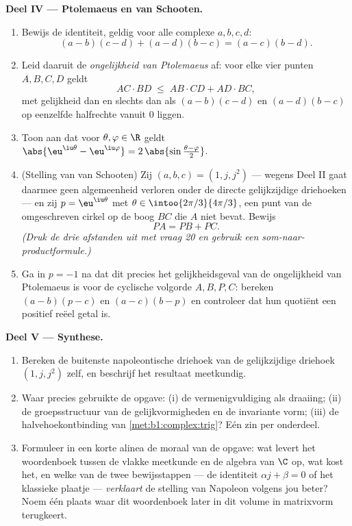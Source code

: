 \begin{problem}
\medskip
\noindent\textbf{Deel IV --- Ptolemaeus en van Schooten.}
\begin{enumerate}[resume]
  \item Bewijs de identiteit, geldig voor alle complexe $a, b, c, d$:
        \[
        (a - b)(c - d) + (a - d)(b - c) = (a - c)(b - d) .
        \]
  \item Leid daaruit de \emph{ongelijkheid van
        Ptolemaeus} af: voor elke
        vier punten $A, B, C, D$ geldt
        \[
        AC \cdot BD \;\leq\; AB \cdot CD + AD \cdot BC ,
        \]
        met gelijkheid dan en slechts dan als $(a-b)(c-d)$ en
        $(a-d)(b-c)$ op eenzelfde halfrechte vanuit $0$ liggen.
  \item Toon aan dat voor $\theta, \varphi \in \R$ geldt
        $\abs{\eu^{\iu\theta} - \eu^{\iu\varphi}} =
        2\,\abs{\sin\frac{\theta - \varphi}2}$.
  \item (Stelling van van Schooten)
        Zij $(a, b, c) = (1, j, j^2)$ --- wegens Deel II gaat daarmee
        geen algemeenheid verloren onder de directe gelijkzijdige
        driehoeken --- en zij $p = \eu^{\iu\theta}$ met $\theta \in
        \intoo{2\pi/3}{4\pi/3}$, een punt van de omgeschreven cirkel op
        de boog $BC$ die $A$ niet bevat. Bewijs
        \[
        PA = PB + PC .
        \]
        \emph{(Druk de drie afstanden uit met vraag 20 en gebruik een
        som-naar-productformule.)}
  \item Ga in $p = -1$ na dat dit precies het gelijkheidsgeval van de
        ongelijkheid van Ptolemaeus is voor de cyclische volgorde $A, B,
        P, C$: bereken $(a - b)(p - c)$ en $(a - c)(b - p)$ en
        controleer dat hun quotiënt een positief reëel getal is.
\end{enumerate}

\medskip
\noindent\textbf{Deel V --- Synthese.}
\begin{enumerate}[resume]
  \item Bereken de buitenste napoleontische driehoek van de
        gelijkzijdige driehoek $(1, j, j^2)$ zelf, en beschrijf het
        resultaat meetkundig.
  \item Waar precies gebruikte de opgave: (i) de vermenigvuldiging als
        draaiing; (ii) de groepsstructuur van de gelijkvormigheden en de
        invariante vorm; (iii) de halvehoekontbinding van
        \cref{met:b1:complex:trig}? Eén zin per onderdeel.
  \item Formuleer in een korte alinea de moraal van de opgave: wat
        levert het woordenboek tussen de vlakke meetkunde en de algebra
        van $\C$ op, wat kost het, en welke van de twee bewijsstappen
        --- de identiteit $\alpha j + \beta = 0$ of het klassieke
        plaatje --- \emph{verklaart} de stelling van Napoleon volgens
        jou beter? Noem één plaats waar dit woordenboek later in dit
        volume in matrixvorm terugkeert.
\end{enumerate}
\end{problem}
